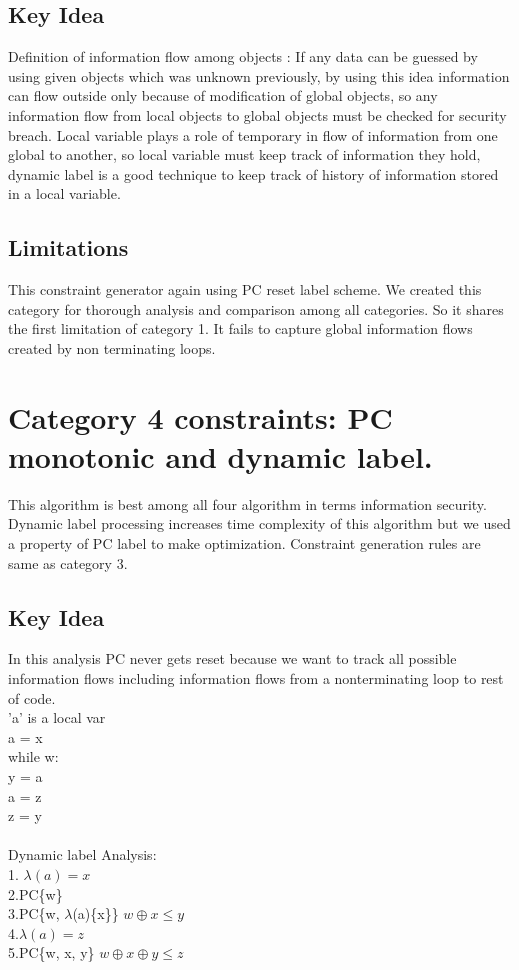 \subsection{Key Idea}
Definition of information flow among objects : If any data can be
guessed by using given objects which was unknown previously, by using this
idea information can flow outside only because of modification of global objects,
so any information flow from local objects to global objects must be
checked for security breach. Local variable plays a role of temporary in flow
of information from one global to another, so local variable must keep track
of information they hold, dynamic label is a good technique to keep track of
history of information stored in a local variable.
\subsection{Limitations}
This constraint generator again using PC reset label scheme. We created this category for thorough analysis and comparison among all categories. So it shares the first limitation of category 1. It fails to capture global information flows created by non terminating loops.   
\section{Category 4 constraints: PC monotonic and dynamic label.}
\label{ch:c4}
This algorithm is best among all four algorithm in terms information security. Dynamic label processing increases time complexity of this algorithm but we used a property of PC label to make optimization.
Constraint generation rules are same as category 3.
\subsection{Key Idea} In this analysis PC never gets reset because we want to track all possible information flows including information flows from a nonterminating loop to rest of code.\\ 
'a' is a local var\\
a = x\\
while w:\\
\hspace*{1cm} y = a\\
\hspace*{1cm} a = z\\
z = y\\~\\
Dynamic label Analysis:\\
1. $\lambda(a) = x$\\
2.PC\{w\}\\
3.PC\{w, $\lambda$(a)\{x\}\} \hspace{1cm} $w\oplus x \le y$\\
4.$\lambda(a) = z$\\
5.PC\{w, x, y\} \hspace{1cm} $w\oplus x\oplus y \le z$\\

